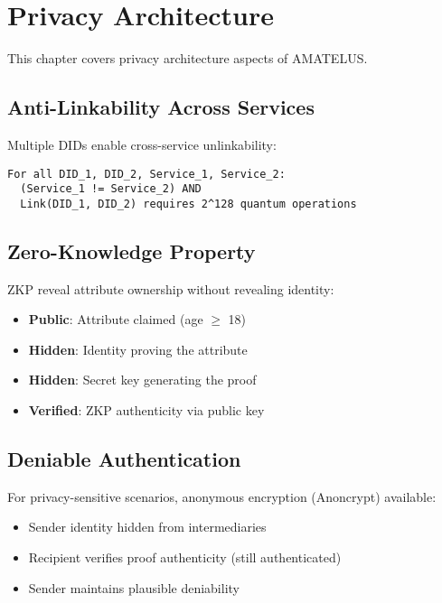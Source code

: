\chapter{Privacy Architecture}


\begin{definition}
  \label{def:priv-chapter}
  This chapter covers privacy architecture aspects of AMATELUS.
  \leanok
\end{definition}
\section{Anti-Linkability Across Services}

Multiple DIDs enable cross-service unlinkability:

\begin{verbatim}
For all DID_1, DID_2, Service_1, Service_2:
  (Service_1 != Service_2) AND
  Link(DID_1, DID_2) requires 2^128 quantum operations
\end{verbatim}

\section{Zero-Knowledge Property}

ZKP reveal attribute ownership without revealing identity:

\begin{itemize}
  \item \textbf{Public}: Attribute claimed (age $\geq$ 18)
  \item \textbf{Hidden}: Identity proving the attribute
  \item \textbf{Hidden}: Secret key generating the proof
  \item \textbf{Verified}: ZKP authenticity via public key
\end{itemize}

\section{Deniable Authentication}

For privacy-sensitive scenarios, anonymous encryption (Anoncrypt) available:

\begin{itemize}
  \item Sender identity hidden from intermediaries
  \item Recipient verifies proof authenticity (still authenticated)
  \item Sender maintains plausible deniability
\end{itemize}

